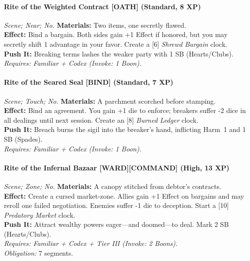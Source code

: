 \paragraph{Rite of the Weighted Contract \textnormal{[OATH]} (Standard, 8 XP)} \emph{Scene; Near; No.}  
\textbf{Materials:} Two items, one secretly flawed.\\
\textbf{Effect:} Bind a bargain. Both sides gain +1 Effect if honored, but you may secretly shift 1 advantage in your favor. Create a [6] \emph{Shrewd Bargain} clock.\\
\textbf{Push It:} Breaking terms lashes the weaker party with 1 SB (Hearts/Clubs).\\
\emph{Requires: Familiar + Codex (\textit{Invoke:} 1 Boon).}

\paragraph{Rite of the Seared Seal \textnormal{[BIND]} (Standard, 7 XP)} \emph{Scene; Touch; No.}  
\textbf{Materials:} A parchment scorched before stamping.\\
\textbf{Effect:} Bind an agreement. You gain +1 die to enforce; breakers suffer -2 dice in all dealings until next session. Create an [8] \emph{Burned Ledger} clock.\\
\textbf{Push It:} Breach burns the sigil into the breaker’s hand, inflicting Harm~1 and 1 SB (Spades).\\
\emph{Requires: Familiar + Codex (\textit{Invoke:} 1 Boon).}

\paragraph{Rite of the Infernal Bazaar \textnormal{[WARD][COMMAND]} (High, 13 XP)} \emph{Scene; Zone; No.}  
\textbf{Materials:} A canopy stitched from debtor’s contracts.\\
\textbf{Effect:} Create a cursed market-zone. Allies gain +1 Effect on bargains and may reroll one failed negotiation. Enemies suffer -1 die to deception. Start a [10] \emph{Predatory Market} clock.\\
\textbf{Push It:} Attract wealthy powers eager—and doomed—to deal. Mark 2 SB (Hearts/Clubs).\\
\emph{Requires: Familiar + Codex + Tier III (\textit{Invoke:} 2 Boons).}\\
\emph{Obligation:} 7 segments.

